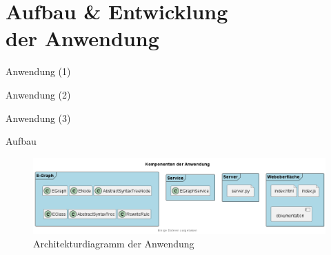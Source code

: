 \EnableTitleSlide
\section{Aufbau \& Entwicklung \\ der Anwendung}

\begin{frame}{Anwendung (1)}
    
\end{frame}

\begin{frame}{Anwendung (2)}
    
\end{frame}

\begin{frame}{Anwendung (3)}
    
\end{frame}

\begin{frame}{Aufbau}
    \begin{figure}[H]
        \centering
        \includegraphics[scale=0.43]{utils/components.png}
        \caption{Architekturdiagramm der Anwendung}
        \label{fig:comps}
    \end{figure}
\end{frame}
